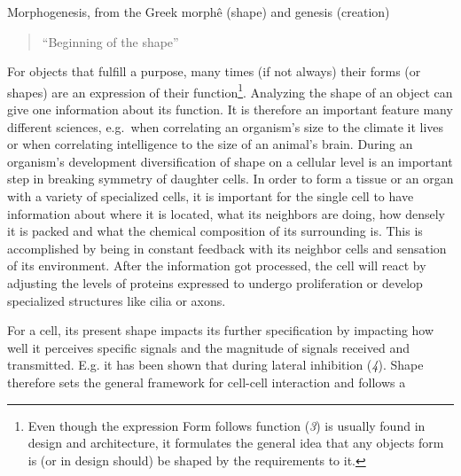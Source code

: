 \documentclass[11pt,singlespacinge,twoside]{reedthesis} %
\begin{document}
Morphogenesis, from the Greek morphê (shape) and genesis (creation)
\begin{quote}
``Beginning of the shape''
\end{quote}
For objects that fulfill a purpose, many times (if not always) their forms (or shapes) are an expression of their function\footnote{Even though the expression Form follows function (\emph{3}) is usually found in design and architecture, it formulates the general idea that any objects form is (or in design should) be shaped by the requirements to it.}. Analyzing the shape of an object can give one information about its function. It is therefore an important feature many different sciences, e.g.~when correlating an organism's size to the climate it lives or when correlating intelligence to the size of an animal's brain. During an organism's development diversification of shape on a cellular level is an important step in breaking symmetry of daughter cells. In order to form a tissue or an organ with a variety of specialized cells, it is important for the single cell to have information about where it is located, what its neighbors are doing, how densely it is packed and what the chemical composition of its surrounding is. This is accomplished by being in constant feedback with its neighbor cells and sensation of its environment. After the information got processed, the cell will react by adjusting the levels of proteins expressed to undergo proliferation or develop specialized structures like cilia or axons.

For a cell, its present shape impacts its further specification by impacting how well it perceives specific signals and the magnitude of signals received and transmitted. E.g. it has been shown that during lateral inhibition (\emph{4}). Shape therefore sets the general framework for cell-cell interaction and follows a

\newline
\end{document}

